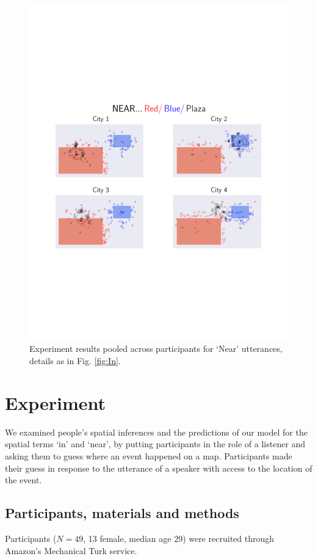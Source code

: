 \documentclass[10pt,letterpaper]{article}
\begin{document}
\begin{figure}[!]
\center
\includegraphics[width=.79\textwidth]{figures/Near.pdf}
\caption{Experiment results pooled across participants for `Near' utterances, details as in Fig. \ref{fig:In}. }
\label{fig:Near}
\end{figure}

\section{Experiment}\label{sec:exps}

We examined people's spatial inferences and the predictions of our model for the spatial terms `in' and `near', by putting participants in the role of a listener and asking them to guess where an event happened on a map. Participants made their guess in response to the utterance of a speaker with access to the location of the event. 

\subsection{Participants, materials and methods}

Participants ($N=49$, 13 female, median age 29) were recruited through Amazon's Mechanical Turk service. 
\end{document}
